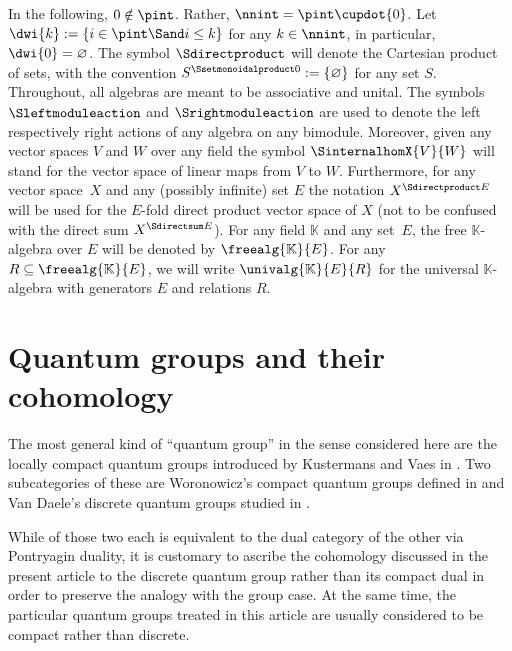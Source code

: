 \documentclass[pdftex]{sigma}
\numberwithin{equation}{section}
\begin{document}
{
  \newcommand{\domspace}{V}
  \newcommand{\codspace}{W}
  \newcommand{\someset}{E}
  \newcommand{\somespace}{X}
  \newcommand{\somefield}{\mathbb{K}}
  \newcommand{\somerels}{R}
  \newcommand{\somemap}{f}
  \newcommand{\anyset}{S}
In the following, $0\notin \pint$. Rather, $\nnint=\pint\cupdot\{0\}$. Let $\dwi{k}:= \{i\in \pint\Sand i\leq k  \}$ for any $k\in\nnint$, in particular, $\dwi{0}=\varnothing$. The symbol $\Sdirectproduct$ will denote the Cartesian product of sets, with the convention $\anyset^{\Ssetmonoidalproduct 0}:= \{\varnothing\}$ for any set $\anyset$. Throughout, all algebras are meant to be associative and unital. The symbols $\Sleftmoduleaction$ and $\Srightmoduleaction$ are used to denote the left  respectively right actions of any algebra on any bimodule. Moreover, given any vector spaces $\domspace$ and $\codspace$ over any field the symbol $\SinternalhomX{\domspace}{\codspace}$ will stand for the vector space of linear maps from $\domspace$ to $\codspace$. Furthermore, for any vector space~$\somespace$ and any (possibly infinite) set  $\someset$ the notation $\somespace^{\Sdirectproduct\someset}$ will be used for the $\someset$-fold direct product  vector space of $\somespace$ (not to be confused with the direct sum $\somespace^{\Sdirectsum\someset}$). For any field $\somefield$ and any set~$\someset$, the free $\somefield$-algebra over $\someset$ will be denoted by $\freealg{\somefield}{ \someset}$. For any $\somerels\subseteq \freealg{\somefield}{ \someset}$, we will write $\univalg{\somefield}{\someset}{\somerels}$ for the universal $\somefield$-algebra with generators $\someset$ and relations $\somerels$.
}


\section{Quantum groups and their cohomology}
\label{section:quantum-groups}
The most general kind of ``quantum group'' in the sense considered here are the locally compact quantum groups introduced by Kustermans and Vaes in \cite{Kustermans2001, Kustermans2005, KustermansVaes2000, KustermansVaes2003}. Two subcategories of these are Woronowicz's compact quantum groups defined in \cite{Woronowicz1987b, Woronowicz1991, Woronowicz1998} and Van Daele's discrete quantum groups studied in \cite{VanDaele1996b, VanDaele1998}.

While of those two each is equivalent to the dual category of the other via Pontryagin duality, it is customary to ascribe the cohomology discussed in the present article to the discrete quantum group rather than its compact dual in order to preserve the analogy with the group case. At the same time, the particular quantum groups treated in this article are usually considered to be compact rather than discrete.
\end{document}
